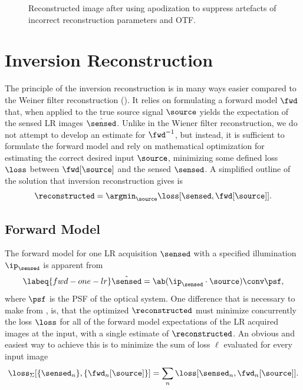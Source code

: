 \begin{figure}[h]
    \caption{Reconstructed image after using apodization to suppress artefacts of incorrect reconstruction parameters
    and \ac{OTF}.}
\end{figure}


\section{Inversion Reconstruction}

The principle of the inversion reconstruction is in many ways easier compared to the Weiner filter reconstruction
    ().
It relies on formulating a forward model \(\fwd\) that, when applied to the true source signal \(\source\) yields the
    expectation of the sensed \ac{LR} images \(\hat{\sensed}\).
Unlike in the Wiener filter reconstruction, we do not attempt to develop an estimate for \(\fwd^{-1}\), but instead, it 
    is sufficient to formulate the forward model and rely on mathematical optimization for estimating the correct 
    desired input \(\source\), minimizing some defined loss \(\loss\) between \(\fwd[\source]\) and the sensed 
    \(\sensed\).
A simplified outline of the solution that inversion reconstruction gives is
    \begin{equation*}
        \reconstructed = \argmin_{\source} \loss[\sensed,  \fwd[\source] ].
    \end{equation*}


\subsection{Forward Model}

The forward model for one \ac{LR} acquisition \(\sensed\) with a specified illumination \(\ip_\sensed\) is apparent from
    \begin{equation}
        \labeq{fwd-one-lr}
        \hat{\sensed} = \ab(\ip_\sensed \cdot\source) \conv \psf,
    \end{equation}
    where \(\psf\) is the \ac{PSF} of the optical system.
One difference that is necessary to make from , is, that the optimized \(\reconstructed\) must 
    minimize concurrently the loss \(\loss\) for all of the forward model expectations of the \ac{LR} acquired images at
    the input, with a single estimate of \(\reconstructed\).
An obvious and easiest way to achieve this is to minimize the sum of loss \(\ell\) evaluated for every input image
    \begin{equation*}
        \loss_\Sigma[\{\sensed_n\},  \{\fwd_n[\source]\} ] = \sum_{n} \loss[\sensed_n,  \fwd_n[\source] ].
    \end{equation*}

